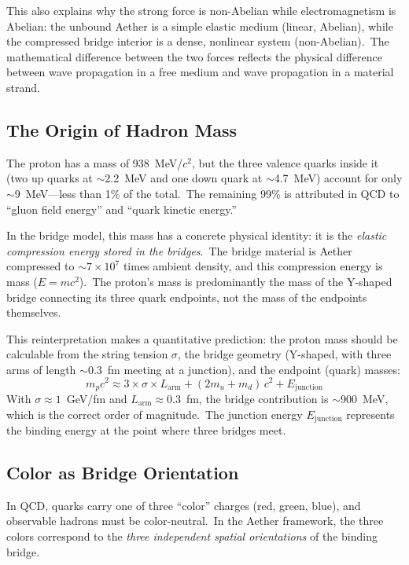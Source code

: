 ﻿\documentclass[12pt,letterpaper]{article}
\begin{document}
This also explains why the strong force is non-Abelian while electromagnetism is
Abelian: the unbound Aether is a simple elastic medium (linear, Abelian), while the
compressed bridge interior is a dense, nonlinear system (non-Abelian).\ The
mathematical difference between the two forces reflects the physical difference
between wave propagation in a free medium and wave propagation in a material strand.


\subsection{The Origin of Hadron Mass}

The proton has a mass of 938~MeV/$c^2$, but the three valence quarks inside it
(two up quarks at $\sim$2.2~MeV and one down quark at $\sim$4.7~MeV) account for
only $\sim$9~MeV---less than 1\% of the total.\ The remaining 99\% is attributed in
QCD to ``gluon field energy'' and ``quark kinetic energy.''

In the bridge model, this mass has a concrete physical identity: it is the \emph{elastic
compression energy stored in the bridges}.\ The bridge material is Aether compressed
to $\sim\!7 \times 10^7$ times ambient density, and this compression energy is mass
($E = mc^2$).\ The proton's mass is predominantly the mass of the Y-shaped
bridge connecting its three quark endpoints, not the mass of the endpoints themselves.

This reinterpretation makes a quantitative prediction: the proton mass should be
calculable from the string tension $\sigma$, the bridge geometry (Y-shaped, with
three arms of length $\sim$0.3~fm meeting at a junction), and the endpoint (quark)
masses:
%
\begin{equation}
  m_p c^2 \approx 3 \times \sigma \times L_{\mathrm{arm}} + (2m_u + m_d)\,c^2 + E_{\mathrm{junction}}
\end{equation}
%
With $\sigma \approx 1$~GeV/fm and $L_{\mathrm{arm}} \approx 0.3$~fm, the bridge
contribution is $\sim$900~MeV, which is the correct order of magnitude.\ The
junction energy $E_{\mathrm{junction}}$ represents the binding energy at the point
where three bridges meet.


\subsection{Color as Bridge Orientation}

In QCD, quarks carry one of three ``color'' charges (red, green, blue), and observable
hadrons must be color-neutral.\ In the Aether framework, the three colors correspond
to the \emph{three independent spatial orientations} of the binding bridge.
\end{document}
